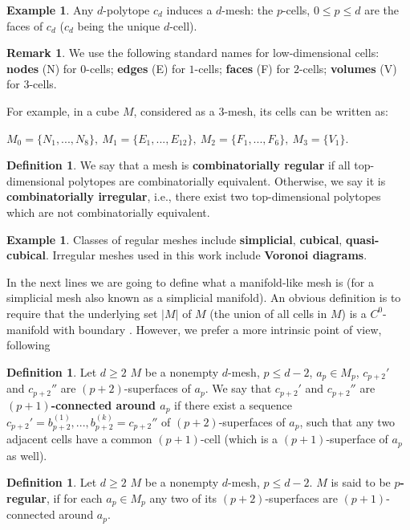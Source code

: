 \documentclass{elsarticle}
\theoremstyle{definition}
\newtheorem{definition}[theorem]{Definition}
\newtheorem{example}[theorem]{Example}
\newtheorem{remark}[theorem]{Remark}
\newcommand{\abs}[1]{\left\lvert#1\right\rvert}
\begin{document}
\begin{example}
\label{thm:mesh_from_polytope}
  Any $d$-polytope $c_d$ induces a $d$-mesh: the $p$-cells, $0 \leq p \leq d$ are the faces of $c_d$ ($c_d$ being the unique $d$-cell).
\end{example}
\begin{remark}
  We use the following standard names for low-dimensional cells: \textbf{nodes} (N) for $0$-cells; \textbf{edges} (E) for $1$-cells; \textbf{faces} (F) for $2$-cells; \textbf{volumes} (V) for $3$-cells.
  
  For example, in a cube $M$, considered as a $3$-mesh, its cells can be written as:
  
  $M_0 = \{N_1, ..., N_8\},\
   M_1 = \{E_1, ..., E_{12}\},\
   M_2 = \{F_1, ..., F_6\},\
   M_3 = \{V_1\}$.
\end{remark}
\begin{definition}
  We say that a mesh is \textbf{combinatorially regular} if all top-dimensional polytopes are combinatorially equivalent. Otherwise, we say it is \textbf{combinatorially irregular}, i.e., there exist two top-dimensional polytopes which are not combinatorially equivalent.
\end{definition}
\begin{example}
  Classes of regular meshes include \textbf{simplicial}, \textbf{cubical}, \textbf{quasi-cubical}. Irregular meshes used in this work include \textbf{Voronoi diagrams}.
\end{example}
In the next lines we are going to define what a manifold-like mesh is (for a simplicial mesh also known as a simplicial manifold). An obvious definition is to require that the underlying set $\abs{M}$ of $M$ (the union of all cells in $M$) is a $C^0$-manifold with boundary \cite[Definition 2.3.9]{Hirani2003_DEC}. However, we prefer a more intrinsic point of view, following \cite[Defnition 7.21]{chen2014digital}
\begin{definition}
  Let $d \geq 2$ $M$ be a nonempty $d$-mesh, $p \leq d - 2$, $a_p \in M_p$, $c_{p + 2}'$ and $c_{p + 2}''$ are $(p + 2)$-superfaces of $a_p$. We say that $c_{p + 2}'$ and $c_{p + 2}''$ are \textbf{$(p + 1)$-connected around $a_p$} if there exist a sequence $c_{p + 2}' = b_{p + 2}^{(1)}, ..., b_{p + 2}^{(k)} = c_{p + 2}''$ of $(p + 2)$-superfaces of $a_p$, such that any two adjacent cells have a common $(p + 1)$-cell (which is a $(p + 1)$-superface of $a_p$ as well).
\end{definition}
\begin{definition}
  Let $d \geq 2$ $M$ be a nonempty $d$-mesh, $p \leq d - 2$. $M$ is said to be \textbf{$p$-regular}, if for each $a_p \in M_p$ any two of its $(p + 2)$-superfaces are $(p + 1)$-connected around $a_p$.
\end{definition}
\end{document}

